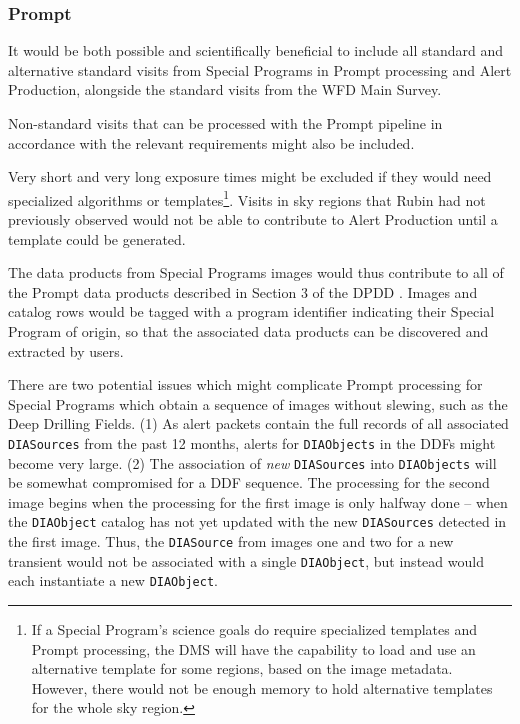 \documentclass[DM,lsstdoc,toc]{lsstdoc}
\begin{document}
\subsubsection{Prompt}

It would be both possible and scientifically beneficial to include all standard and alternative standard visits from Special Programs in Prompt processing and Alert Production, alongside the standard visits from the WFD Main Survey.

Non-standard visits that can be processed with the Prompt pipeline in accordance with the relevant requirements might also be included.

Very short and very long exposure times might be excluded if they would need specialized algorithms or templates\footnote{If a Special Program's science goals do require specialized templates and Prompt processing, the DMS will have the capability to load and use an alternative template for some regions, based on the image metadata. However, there would not be enough memory to hold alternative templates for the whole sky region.}.
Visits in sky regions that Rubin had not previously observed would not be able to contribute to Alert Production until a template could be generated.

The data products from Special Programs images would thus contribute to all of the Prompt data products described in Section 3 of the DPDD . 
Images and catalog rows would be tagged with a program identifier indicating their Special Program of origin, so that the associated data products can be discovered and extracted by users.

There are two potential issues which might complicate Prompt processing for Special Programs which obtain a sequence of images without slewing, such as the Deep Drilling Fields.
(1) As alert packets contain the full records of all associated {\tt DIASources} from the past 12 months, alerts for {\tt DIAObjects} in the DDFs might become very large.
(2) The association of {\it new} {\tt DIASources} into {\tt DIAObjects} will be somewhat compromised for a DDF sequence.
The processing for the second image begins when the processing for the first image is only halfway done -- when the {\tt DIAObject} catalog has not yet updated with the new {\tt DIASources} detected in the first image.
Thus, the {\tt DIASource} from images one and two for a new transient would not be associated with a single {\tt DIAObject}, but instead would each instantiate a new {\tt DIAObject}.
\end{document}
